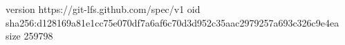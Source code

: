 version https://git-lfs.github.com/spec/v1
oid sha256:d128169a81e1cc75e070df7a6af6c70d3d952c35aac2979257a693c326c9e4ea
size 259798
